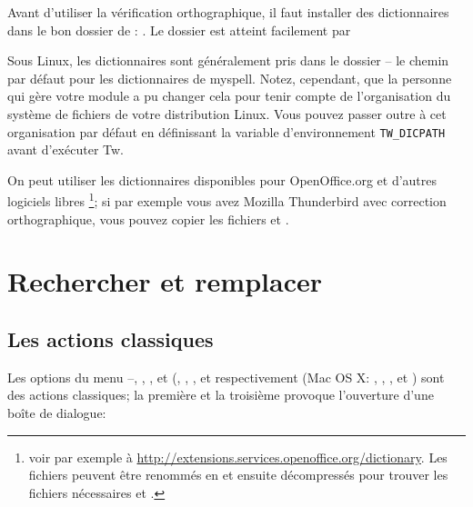 Avant d'utiliser la vérification orthographique, il faut installer des dictionnaires dans le bon dossier de \Tw: . Le dossier  est atteint facilement par  \submenu{}

\begin{OSLinux}
Sous Linux, les dictionnaires sont généralement pris dans le dossier  -- le chemin par défaut pour les dictionnaires de myspell. Notez, cependant, que la personne qui gère votre module \Tw{} a pu changer cela pour tenir compte de l'organisation du système de fichiers de votre distribution Linux. Vous pouvez passer outre à cet organisation par défaut en définissant la variable d'environnement \verb+TW_DICPATH+ avant d'exécuter Tw.
\end{OSLinux}

On peut utiliser les dictionnaires disponibles pour OpenOffice.org et d'autres logiciels libres \footnote{voir par exemple à \url{http://extensions.services.openoffice.org/dictionary}. Les fichiers  peuvent être renommés en  et ensuite décompressés pour trouver les fichiers nécessaires  et .}; si par exemple vous avez Mozilla Thunderbird avec correction orthographique, vous pouvez copier les fichiers  et . 

\section{Rechercher et remplacer}


\subsection{Les actions classiques}

Les options du menu --, , ,  et  (, , ,  et  respectivement (Mac OS X: , , ,  et ) sont des actions classiques; la première et la troisième provoque l'ouverture d'une boîte de dialogue:

